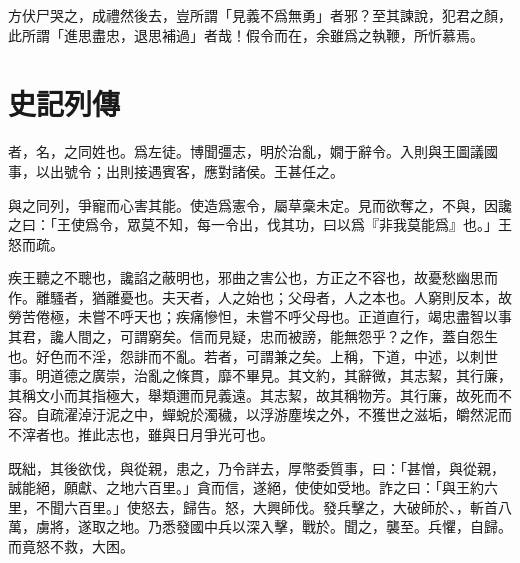 方伏尸哭之，成禮然後去，豈所謂「見義不爲無勇」者邪？至其諫說，犯君之顏，此所謂「進思盡忠，退思補過」者哉！假令而在，余雖爲之執鞭，所忻慕焉。

\section[屈原列傳\quad{\small 史記}]{{\normalsize 史記}\quad{}列傳}
者，名，之同姓也。爲左徒。博聞彊志，明於治亂，嫺于辭令。入則與王圖議國事，以出號令；出則接遇賓客，應對諸侯。王甚任之。

與之同列，爭寵而心害其能。使造爲憲令，屬草稾未定。見而欲奪之，不與，因讒之曰：「王使爲令，眾莫不知，每一令出，伐其功，曰以爲『非我莫能爲』也。」王怒而疏。

疾王聽之不聰也，讒諂之蔽明也，邪曲之害公也，方正之不容也，故憂愁幽思而作。離騷者，猶離憂也。夫天者，人之始也；父母者，人之本也。人窮則反本，故勞苦倦極，未嘗不呼天也；疾痛慘怛，未嘗不呼父母也。正道直行，竭忠盡智以事其君，讒人間之，可謂窮矣。信而見疑，忠而被謗，能無怨乎？之作，蓋自怨生也。好色而不淫，怨誹而不亂。若者，可謂兼之矣。上稱，下道，中述，以刺世事。明道德之廣崇，治亂之條貫，靡不畢見。其文約，其辭微，其志絜，其行廉，其稱文小而其指極大，舉類邇而見義遠。其志絜，故其稱物芳。其行廉，故死而不容。自疏濯淖汙泥之中，蟬蛻於濁穢，以浮游塵埃之外，不獲世之滋垢，皭然泥而不滓者也。推此志也，雖與日月爭光可也。

既絀，其後欲伐，與從親，患之，乃令詳去，厚幣委質事，曰：「甚憎，與從親，誠能絕，願獻、之地六百里。」貪而信，遂絕，使使如受地。詐之曰：「與王約六里，不聞六百里。」使怒去，歸告。怒，大興師伐。發兵擊之，大破師於、，斬首八萬，虜將，遂取之地。乃悉發國中兵以深入擊，戰於。聞之，襲至。兵懼，自歸。而竟怒不救，大困。

